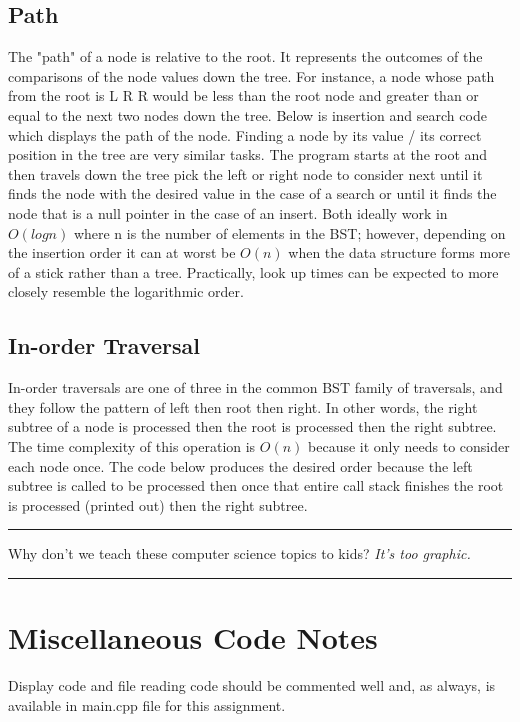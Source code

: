 \documentclass[letterpaper, 10pt]{article}
\begin{document}
\subsection{Path}
The "path" of a node is relative to the root. It represents the outcomes of the comparisons of the node values
down the tree. For instance, a node whose path from the root is L R R would be less than the root node and greater
than or equal to the next two nodes down the tree. Below is insertion and search code which displays the path of 
the node. Finding a node by its value / its correct position in the tree are very similar tasks. The program
starts at the root and then travels down the tree pick the left or right node to consider next until it finds
the node with the desired value in the case of a search or until it finds the node that is a null pointer in the
case of an insert.
Both ideally work in \(O(logn)\) where n is the number of elements in the BST;
however, depending on the insertion order it can at worst be \(O(n)\) when the data structure forms
more of a stick rather than a tree. Practically, look up times can be expected to more closely resemble
the logarithmic order.



\subsection{In-order Traversal}
In-order traversals are one of three in the common BST family of traversals, and they follow the pattern of
left then root then right. In other words, the right subtree of a node is processed 
then the root is processed then the right subtree. The time complexity of this operation is 
\(O(n)\) because it only needs to consider each node once. The code below produces the desired order because
the left subtree is called to be processed then once that entire call stack finishes the root is processed (printed out)
then the right subtree.

\vspace{.25cm}
\hrule
\vspace{.25cm}
\noindent
Why don't we teach these computer science topics to kids? \textit{It's too graphic.}
\hrule
\vspace{1cm}
\section{Miscellaneous Code Notes}
Display code and file reading code should be commented well and, as always, is available in
main.cpp file for this assignment.
\end{document}
